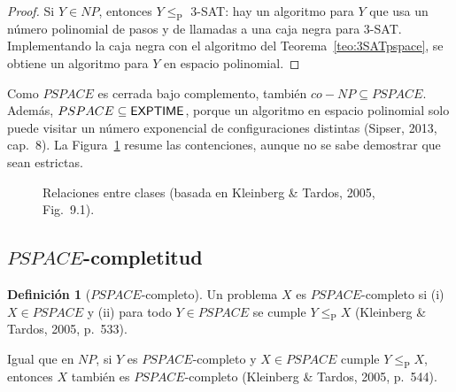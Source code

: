 \documentclass[11pt,letterpaper]{article}
\theoremstyle{plain}
\theoremstyle{definition}
\newtheorem{definicion}[teorema]{Definición}
\theoremstyle{remark}
\newcommand{\nombreMat}[1]{\ensuremath{\text{\fontencoding{OT1}\fontfamily{cmss}\upshape\selectfont #1}}}
\newcommand{\PSPACE}{\nombreMat{PSPACE}}
\newcommand{\NP}{\nombreMat{NP}}
\newcommand{\Pclass}{\nombreMat{P}}
\newcommand{\coNP}{\nombreMat{co-NP}}
\newcommand{\EXPTIME}{\nombreMat{EXPTIME}}
\def\PSPACE{PSPACE}\def\NP{NP}\def\coNP{co-NP}%
\newcommand{\ptime}{\leq_{\mathrm{P}}}
\begin{document}
\begin{proof}
Si $Y\in\NP$, entonces $Y\ptime$ 3-SAT: hay un algoritmo
para $Y$ que usa un número polinomial de pasos y de llamadas
a una caja negra para 3-SAT. Implementando la caja negra
con el algoritmo del Teorema~\ref{teo:3SATpspace},
se obtiene un algoritmo para $Y$ en espacio polinomial.
\end{proof}

Como $\PSPACE$ es cerrada bajo complemento, también
$\coNP\subseteq\PSPACE$. Además,
$\PSPACE\subseteq\EXPTIME$, porque un algoritmo en espacio
polinomial solo puede visitar un número exponencial de
configuraciones distintas (Sipser, 2013, cap.~8).
La Figura~\ref{fig:jerarquia} resume las contenciones,
aunque no se sabe demostrar que sean estrictas.

\begin{figure}[ht]
\centering
{}
\caption{Relaciones entre clases (basada en
Kleinberg \& Tardos, 2005, Fig.~9.1).}
\label{fig:jerarquia}
\end{figure}

\subsection{$\PSPACE$-completitud}

\begin{definicion}[$\PSPACE$-completo]
Un problema $X$ es $\PSPACE$-completo si
(i) $X\in\PSPACE$ y (ii) para todo $Y\in\PSPACE$
se cumple $Y\ptime X$
(Kleinberg \& Tardos, 2005, p.~533).
\end{definicion}

Igual que en $\NP$, si $Y$ es $\PSPACE$-completo
y $X\in\PSPACE$ cumple $Y\ptime X$, entonces $X$
también es $\PSPACE$-completo
(Kleinberg \& Tardos, 2005, p.~544).
\end{document}
